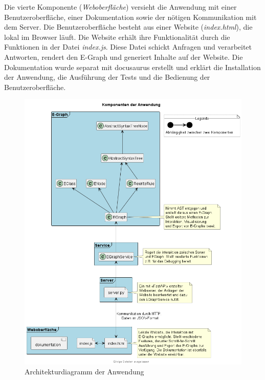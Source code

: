 
Die vierte Komponente (\textit{Weboberfläche}) versieht die Anwendung mit einer Benutzeroberfläche, einer Dokumentation sowie der nötigen Kommunikation mit dem Server.
Die Benutzeroberfläche besteht aus einer Website (\textit{index.html}), die lokal im Browser läuft. Die Website erhält ihre Funktionalität durch die Funktionen in der 
Datei \textit{index.js}. Diese Datei schickt Anfragen und verarbeitet Antworten, rendert den E-Graph und generiert Inhalte auf der Website. 
Die Dokumentation wurde separat mit docusaurus erstellt und erklärt die Installation der Anwendung, die Ausführung der Tests und die Bedienung der Benutzeroberfläche.  



\begin{figure}[H]
  \centering
  \includegraphics[scale=0.6]{../fig/components.png}
  \caption{Architekturdiagramm der Anwendung}
  \label{fig:architektur}
\end{figure}

